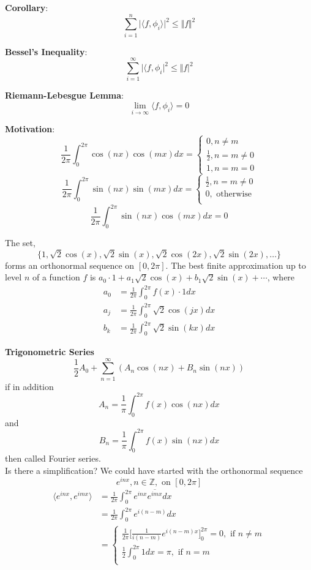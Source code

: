 \documentclass[12pt]{article}
\begin{document}
\noindent \textbf{Corollary}: 
$$\sum^n_{i=1}\vert \langle f, \phi_i \rangle \vert^2 \leq \Vert f\Vert^2$$

\noindent \textbf{Bessel's Inequality}: 
$$ \sum^\infty_{i=1} \vert \langle f, \phi_i \vert^2 \leq \Vert f \vert^2$$

\noindent \textbf{Riemann-Lebesgue Lemma}: $$\lim_{i \rightarrow \infty} \langle f, \phi_i \rangle = 0$$

\noindent \textbf{Motivation}: 
$$ \frac{1}{2\pi} \int^{2\pi}_{0} \cos (nx) \cos(mx) dx =
\begin{cases}
0, n \not= m\\
\frac{1}{2}, n=m\not=0\\
1, n=m=0
\end{cases}$$
$$ \frac{1}{2\pi} \int^{2\pi}_{0} \sin (nx) \sin(mx) dx =
\begin{cases}
\frac{1}{2}, n = m \not= 0\\
0, \text{ otherwise}\\
\end{cases}$$
$$ \frac{1}{2\pi} \int^{2\pi}_{0} \sin (nx) \cos(mx) dx = 0 $$

The set, 
$$\{1, \sqrt{2}\cos(x), \sqrt{2}\sin(x), \sqrt{2}\cos(2x), \sqrt{2}\sin(2x), \dots\} $$
forms an orthonormal sequence on $[0, 2\pi]$. The best finite approximation up to level $n$ of a function $f$ is $a_0 \cdot 1 + a_1 \sqrt{2}\cos(x) + b_1\sqrt{2}\sin(x)+\cdots$, where 
\begin{align*}
a_0 &= \frac{1}{2\pi} \int^{2\pi}_0 f(x) \cdot 1 dx \\
a_j &= \frac{1}{2\pi} \int^{2\pi}_0 \sqrt{2}\cos(jx)  dx \\ 
b_k &= \frac{1}{2\pi} \int^{2\pi}_0 \sqrt{2}\sin(kx)dx 
\end{align*}

\noindent \textbf{Trigonometric Series} \\
$$\frac{1}{2}A_0 + \sum^\infty_{n=1}(A_n\cos(nx) + B_n \sin(nx))$$
if in addition
$$A_n = \frac{1}{\pi} \int^{2\pi}_0 f(x) \cos(nx) dx$$
and
$$B_n = \frac{1}{\pi} \int^{2\pi}_0 f(x)\sin(nx) dx$$
then called Fourier series. \\

Is there a simplification? We could have started with the orthonormal sequence
$$e^{inx}, n \in \mathbb{Z}, \text{ on } [0,2\pi]$$
\begin{align*}
\langle e^{inx}, e^{imx}\rangle &=  \frac{1}{2\pi} \int^{2\pi}_0 e^{inx}\overline{e^{imx}} dx \\
&= \frac{1}{2\pi} \int^{2\pi}_0 e^{i(n-m)}dx \\
&= \begin{cases}
\frac{1}{2\pi} \Big[ \frac{1}{i(n-m)} e^{i(n-m)x}\Big]^{2\pi}_0 = 0, \text{ if } n \not=m \\
\frac{1}{2} \int^{2\pi}_0 1 dx =\pi, \text{ if } n=m \\
\end{cases}
\end{align*}
\end{document}
